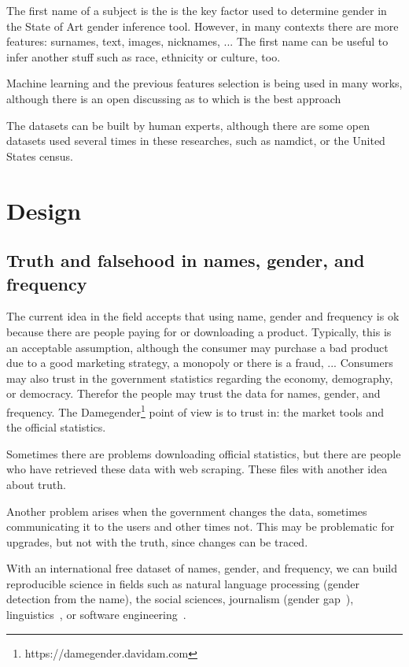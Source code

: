 \documentclass[a4paper]{article}
\begin{document}
The first name of a subject is the is the key factor used to
determine gender in the State of Art gender inference tool.
However, in many contexts there are more features: surnames,
text, images, nicknames, ... The first name can be useful to
infer another stuff such as race, ethnicity or culture, too.

Machine learning and the previous features selection is being
used in many works, although there is an open discussing as
to which is the best approach

The datasets can be built by human experts, although there are
some open datasets used several times in these researches, such as
namdict, or the United States census.

\section{Design}
\label{sec:design}

\subsection{Truth and falsehood in names, gender, and frequency}
\label{sec:truthandfalsehood}

The current idea in the field accepts that using name, gender and
frequency is ok because there are people paying for or downloading
a product. Typically, this is an acceptable assumption, although
the consumer may purchase a bad product due to a good marketing
strategy, a monopoly or there is a fraud, ... Consumers may also 
trust in the government statistics regarding the economy,
demography, or democracy. Therefor the people may trust the data
for names, gender, and frequency. The
Damegender\footnote{https://damegender.davidam.com} point of view
is to trust in: the market tools and the official statistics.

Sometimes there are problems downloading official statistics, but
there are people who have retrieved these data with web scraping.
These files with another idea about truth.

Another problem arises when the government changes the data,
sometimes communicating it to the users and other times
not. This may be problematic for upgrades, but not with the truth,
since changes can be traced. 

With an international free dataset of names, gender, and frequency,
we can build reproducible science in fields such as natural language
processing (gender detection from the name), the social sciences, 
journalism (gender
gap~\cite{holman2018gender,mislove2011understanding,niemi2017gendered,de2014genero}),
linguistics~\cite{lawson2005russian,krueger1962mongolian,van2020gender,agyekum2006sociolinguistic,fraser1987lexicon},
or software engineering~\cite{vasilescu2012gender}.
\end{document}
